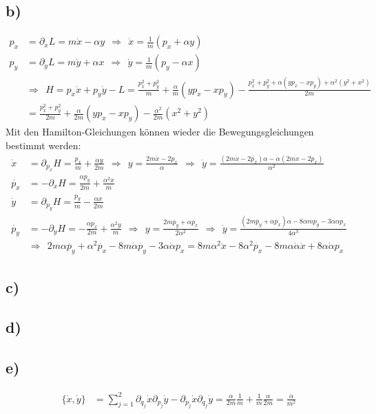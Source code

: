 \documentclass[a4paper,12pt]{article}
\begin{document}
\subsection*{b)}
\begin{align*}
p_x&=\partial_{\dot{x}}L=m\dot{x}-\alpha y\ \ \Rightarrow\ \ \dot{x}=\frac{1}{m}(p_x+\alpha y) \\
p_y&=\partial_{\dot{y}}L=m\dot{y}+\alpha x\ \ \Rightarrow\ \ \dot{y}=\frac{1}{m}(p_y-\alpha x) \\
&\Rightarrow\ \ H=p_x\dot{x}+p_y\dot{y}-L=\frac{p_x^2+p_y^2}{m}+\frac{\alpha}{m}(yp_x-xp_y)-\frac{p_x^2+p_y^2+\alpha (yp_x-xp_y)+\alpha^2(y^2+x^2)}{2m}\\
&=\frac{p_x^2+p_y^2}{2m}+\frac{\alpha}{2m}(yp_x-xp_y)-\frac{\alpha^2}{2m}(x^2+y^2)
\end{align*}
Mit den Hamilton-Gleichungen können wieder die Bewegungsgleichungen bestimmt werden:
\begin{align*}
\dot{x}&=\partial_{p_x}H=\frac{p_x}{m}+\frac{\alpha y}{2m}\ \ \Rightarrow\ \ y = \frac{2m\dot{x}-2p_x}{\alpha}\ \ \Rightarrow\ \ \dot{y}=\frac{(2m\ddot{x}-2\dot{p_x})\alpha-\dot{\alpha}(2m\dot{x}-2p_x)}{\alpha^2} \\
\dot{p_x}&=-\partial_{x}H=\frac{\alpha p_y}{2m}+\frac{\alpha^2 x}{m}\\
\dot{y}&=\partial_{p_y}H=\frac{p_y}{m}-\frac{\alpha x}{2m} \\
\dot{p_y}&=-\partial_{y}H=-\frac{\alpha p_x}{2m}+\frac{\alpha^2 y}{m}\ \ \Rightarrow\ \ y=\frac{2m\dot{p_y}+\alpha p_x}{2\alpha^2}\ \ \Rightarrow\ \ \dot{y}=\frac{(2m\ddot{p_y}+\alpha\dot{p_x})\alpha-8\dot{\alpha}m\dot{p_y}-3\dot{\alpha}\alpha p_x}{4\alpha^3} \\
&\Rightarrow\ \ 2m\alpha \ddot{p_y}+\alpha^2\dot{p_x}-8m\dot{\alpha}\dot{p_y}-3\alpha\dot{\alpha}p_x=8m\alpha^2\ddot{x}-8\alpha^2\dot{p_x}-8m\alpha\dot{\alpha}\dot{x}+8\alpha\dot{\alpha}p_x
\end{align*}
\subsection*{c)}
\subsection*{d)}
\subsection*{e)}
\begin{align*}
\{\dot{x},\dot{y}\}&=\sum_{j=1}^{2}\partial_{q_j}\dot{x}\partial_{p_j}\dot{y}-\partial_{p_j}\dot{x}\partial_{q_j}\dot{y}=\frac{\alpha}{2m}\frac{1}{m}+\frac{1}{m}\frac{\alpha}{2m}=\frac{\alpha}{m^2}
\end{align*}
\end{document}
